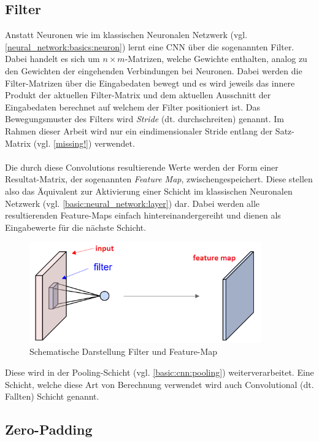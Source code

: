 \subsection{Filter}
\label{basic:cnn:filter}
Anstatt Neuronen wie im klassischen Neuronalen Netzwerk (vgl. \ref{neural_network:basics:neuron}) lernt eine CNN über die sogenannten Filter. Dabei handelt es sich um $n\times m$-Matrizen, welche Gewichte enthalten, analog zu den Gewichten der eingehenden Verbindungen bei Neuronen. Dabei werden die Filter-Matrizen über die Eingabedaten bewegt und es wird jeweils das innere Produkt der aktuellen Filter-Matrix und dem aktuellen Ausschnitt der Eingabedaten berechnet auf welchem der Filter positioniert ist. Das Bewegungsmuster des Filters wird \emph{Stride} (dt. durchschreiten) genannt. Im Rahmen dieser Arbeit wird nur ein eindimensionaler Stride entlang der Satz-Matrix (vgl. \ref{missing!}) verwendet.\\\\
Die durch diese Convolutions resultierende Werte werden der Form einer Resultat-Matrix, der sogenannten \emph{Feature Map}, zwischengespeichert. Diese stellen also das Äquivalent zur Aktivierung einer Schicht im klassischen Neuronalen Netzwerk (vgl. \ref{basic:neural_network:layer}) dar. Dabei werden alle resultierenden Feature-Maps einfach hintereinandergereiht und dienen als Eingabewerte für die nächste Schicht. 

\begin{figure}[h]
	\centering
	\includegraphics[width=10cm]{img/filter_feature_map}
	\caption{Schematische Darstellung Filter und Feature-Map}
\end{figure}

Diese wird in der Pooling-Schicht (vgl. \ref{basic:cnn:pooling}) weiterverarbeitet. Eine Schicht, welche diese Art von Berechnung verwendet wird auch Convolutional (dt. Fallten) Schicht genannt.
\subsection{Zero-Padding}
\blindtext

